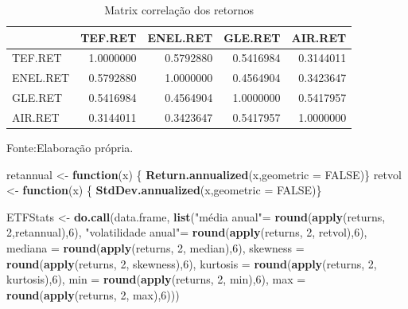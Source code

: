 \documentclass[
  12pt,
  a4paper,
  openany]{book}
\newenvironment{Shaded}{\begin{snugshade}}{\end{snugshade}}
\newcommand{\ControlFlowTok}[1]{\textcolor[rgb]{0.13,0.29,0.53}{\textbf{#1}}}
\newcommand{\DataTypeTok}[1]{\textcolor[rgb]{0.13,0.29,0.53}{#1}}
\newcommand{\DecValTok}[1]{\textcolor[rgb]{0.00,0.00,0.81}{#1}}
\newcommand{\KeywordTok}[1]{\textcolor[rgb]{0.13,0.29,0.53}{\textbf{#1}}}
\newcommand{\NormalTok}[1]{#1}
\newcommand{\OtherTok}[1]{\textcolor[rgb]{0.56,0.35,0.01}{#1}}
\newcommand{\StringTok}[1]{\textcolor[rgb]{0.31,0.60,0.02}{#1}}
\begin{document}
\normalsize

\begin{table}[!h]

\caption{\label{tab:unnamed-chunk-10}Matrix correlação dos retornos}
\centering
\begin{tabular}[t]{lrrrr}
\toprule
  & TEF.RET & ENEL.RET & GLE.RET & AIR.RET\\
\midrule
TEF.RET & 1.0000000 & 0.5792880 & 0.5416984 & 0.3144011\\
ENEL.RET & 0.5792880 & 1.0000000 & 0.4564904 & 0.3423647\\
GLE.RET & 0.5416984 & 0.4564904 & 1.0000000 & 0.5417957\\
AIR.RET & 0.3144011 & 0.3423647 & 0.5417957 & 1.0000000\\
\bottomrule
\end{tabular}
\end{table}
\FloatBarrier
\centering

Fonte:Elaboração própria.

\justifying
\bigskip
\scriptsize

\begin{Shaded}
\begin{Highlighting}[]
\NormalTok{retannual \textless{}{-}}\StringTok{ }\ControlFlowTok{function}\NormalTok{(x) \{  }
  \KeywordTok{Return.annualized}\NormalTok{(x,}\DataTypeTok{geometric =} \OtherTok{FALSE}\NormalTok{)\}}
\NormalTok{retvol \textless{}{-}}\StringTok{ }\ControlFlowTok{function}\NormalTok{(x) \{  }
  \KeywordTok{StdDev.annualized}\NormalTok{(x,}\DataTypeTok{geometric =} \OtherTok{FALSE}\NormalTok{)\}}

\NormalTok{ETFStats \textless{}{-}}\StringTok{ }\KeywordTok{do.call}\NormalTok{(data.frame, }
                    \KeywordTok{list}\NormalTok{(}\StringTok{"média anual"}\NormalTok{=}\StringTok{ }\KeywordTok{round}\NormalTok{(}\KeywordTok{apply}\NormalTok{(returns, }\DecValTok{2}\NormalTok{,retannual),}\DecValTok{6}\NormalTok{),}
                         \StringTok{"volatilidade anual"}\NormalTok{=}\StringTok{ }\KeywordTok{round}\NormalTok{(}\KeywordTok{apply}\NormalTok{(returns, }\DecValTok{2}\NormalTok{, retvol),}\DecValTok{6}\NormalTok{),}
                         \DataTypeTok{mediana =} \KeywordTok{round}\NormalTok{(}\KeywordTok{apply}\NormalTok{(returns, }\DecValTok{2}\NormalTok{, median),}\DecValTok{6}\NormalTok{),}
                         \DataTypeTok{skewness =} \KeywordTok{round}\NormalTok{(}\KeywordTok{apply}\NormalTok{(returns, }\DecValTok{2}\NormalTok{, skewness),}\DecValTok{6}\NormalTok{),}
                         \DataTypeTok{kurtosis =} \KeywordTok{round}\NormalTok{(}\KeywordTok{apply}\NormalTok{(returns, }\DecValTok{2}\NormalTok{, kurtosis),}\DecValTok{6}\NormalTok{),}
                         \DataTypeTok{min =} \KeywordTok{round}\NormalTok{(}\KeywordTok{apply}\NormalTok{(returns, }\DecValTok{2}\NormalTok{, min),}\DecValTok{6}\NormalTok{),}
                         \DataTypeTok{max =} \KeywordTok{round}\NormalTok{(}\KeywordTok{apply}\NormalTok{(returns, }\DecValTok{2}\NormalTok{, max),}\DecValTok{6}\NormalTok{)))}
\end{Highlighting}
\end{Shaded}
\end{document}
